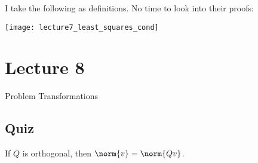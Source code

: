 \documentclass[../main.tex]{subfiles}
\begin{document}
\begin{definition}
    I take the following as definitions. No time to look into their proofs:
    \begin{center}
        \texttt{[image: lecture7\_least\_squares\_cond]}
    \end{center}
\end{definition}


\section{Lecture 8}{Problem Transformations}

\subsection{Quiz}
\begin{remark}
    If $Q$ is orthogonal, then $\norm{v} = \norm{Qv}$.
\end{remark}
\end{document}
